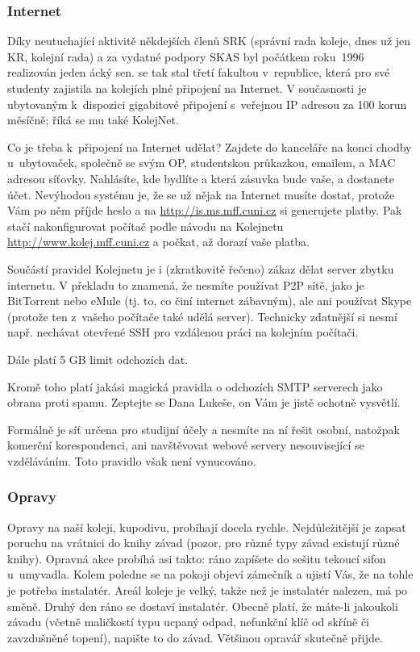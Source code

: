 \subsubsection{Internet}

Díky neutuchající aktivitě někdejších členů SRK (správní rada
koleje, dnes už jen KR, kolejní rada) a za vydatné podpory SKAS
byl počátkem roku~1996 realizován jeden \mfz{}ácký sen. \Mfz{} se
tak stal třetí fakultou v~republice, která pro své studenty
zajistila na kolejích plné připojení na Internet. V současnosti je ubytovaným k~dispozici gigabitové připojení s~veřejnou IP adresou za 100 korun měsíčně; říká se mu také KolejNet.

Co je třeba k~připojení na Internet udělat?
Zajdete do kanceláře na konci chodby u~ubytovaček, společně se svým OP, studentskou průkazkou, emailem, a MAC adresou síťovky. Nahlásíte, kde bydlíte a která zásuvka bude vaše, a dostanete účet. 
Nevýhodou systému je,
že se už nějak na Internet musíte dostat, protože Vám po něm
příjde heslo a na \url{http://is.ms.mff.cuni.cz} si generujete
platby. Pak stačí nakonfigurovat počítač podle návodu na Kolejnetu
\url{http://www.kolej.mff.cuni.cz} a počkat, až dorazí vaše
platba.


Součástí pravidel Kolejnetu je i (zkratkovitě řečeno) zákaz dělat server zbytku internetu. V překladu to znamená, že nesmíte používat P2P sítě, jako je BitTorrent nebo eMule (tj. to, co činí internet zábavným), ale ani používat Skype (protože ten z~vašeho počítače také udělá server). Technicky zdatnější si nesmí např. nechávat otevřené SSH pro vzdálenou práci na kolejním počítači.

Dále platí 5 GB limit odchozích dat.

Kromě toho platí jakási magická pravidla o odchozích SMTP serverech jako obrana proti spamu. Zeptejte se Dana Lukeše, on Vám je jistě ochotně vysvětlí.

Formálně je síť určena pro studijní účely a nesmíte na ní řešit osobní, natožpak komerční korespondenci, ani navštěvovat webové servery nesouvisející se vzdě\-lá\-vá\-ním. Toto pravidlo však není vynucováno.


\subsubsection{Opravy}

Opravy na naší koleji, kupodivu, probíhají docela rychle. Nejdůležitější
je zapsat poruchu na vrátnici do knihy závad (pozor, pro různé typy závad
existují různé knihy). Opravná akce probíhá asi takto: ráno zapíšete
do sešitu tekoucí sifon u~umyvadla. Kolem poledne se na pokoji objeví
zámečník a ujistí Vás, že na tohle je potřeba instalatér. Areál koleje je
velký, takže než je instalatér nalezen, má po směně. Druhý den ráno se
dostaví instalatér.  Obecně platí, že máte-li jakoukoli závadu (včetně
maličkostí typu ucpaný odpad, nefunkční klíč od skříně či zavzdušněné
topení), napište to do závad. Většinou opravář skutečně přijde.


